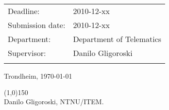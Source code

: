 \begin{titlepage}
\begin{center}
\begin{tabular}{ p{4cm} p{11cm}}
Deadline: & 2010-12-xx \\
Submission date: & 2010-12-xx \\
Department: & Department of Telematics \\
Supervisor: & Danilo Gligoroski \\\\
\end{tabular}
\vspace{0.5cm}

Trondheim, \today 

\vspace{0.4cm}
\line(1,0){150} \\
Danilo Gligoroski, NTNU/ITEM. 

\end{center}
\end{titlepage}

